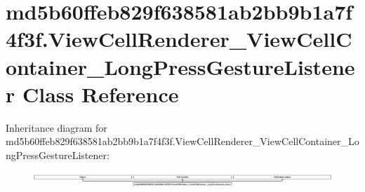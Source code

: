 \hypertarget{classmd5b60ffeb829f638581ab2bb9b1a7f4f3f_1_1ViewCellRenderer__ViewCellContainer__LongPressGestureListener}{}\section{md5b60ffeb829f638581ab2bb9b1a7f4f3f.\+View\+Cell\+Renderer\+\_\+\+View\+Cell\+Container\+\_\+\+Long\+Press\+Gesture\+Listener Class Reference}
\label{classmd5b60ffeb829f638581ab2bb9b1a7f4f3f_1_1ViewCellRenderer__ViewCellContainer__LongPressGestureListener}
Inheritance diagram for md5b60ffeb829f638581ab2bb9b1a7f4f3f.\+View\+Cell\+Renderer\+\_\+\+View\+Cell\+Container\+\_\+\+Long\+Press\+Gesture\+Listener\+:\begin{figure}[H]
\begin{center}
\leavevmode
\includegraphics[height=0.598291cm]{classmd5b60ffeb829f638581ab2bb9b1a7f4f3f_1_1ViewCellRenderer__ViewCellContainer__LongPressGestureListener}
\end{center}
\end{figure}
